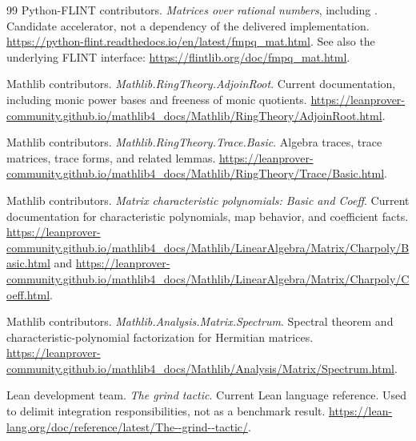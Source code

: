 \begin{thebibliography}{99}
Python-FLINT contributors. \emph{Matrices over rational numbers}, including . Candidate accelerator, not a dependency of the delivered implementation.
\url{https://python-flint.readthedocs.io/en/latest/fmpq_mat.html}.
See also the underlying FLINT interface:
\url{https://flintlib.org/doc/fmpq_mat.html}.

Mathlib contributors. \emph{Mathlib.RingTheory.AdjoinRoot}. Current documentation, including monic power bases and freeness of monic quotients.
\url{https://leanprover-community.github.io/mathlib4_docs/Mathlib/RingTheory/AdjoinRoot.html}.

Mathlib contributors. \emph{Mathlib.RingTheory.Trace.Basic}. Algebra traces, trace matrices, trace forms, and related lemmas.
\url{https://leanprover-community.github.io/mathlib4_docs/Mathlib/RingTheory/Trace/Basic.html}.

Mathlib contributors. \emph{Matrix characteristic polynomials: Basic and Coeff}. Current documentation for characteristic polynomials, map behavior, and coefficient facts.
\url{https://leanprover-community.github.io/mathlib4_docs/Mathlib/LinearAlgebra/Matrix/Charpoly/Basic.html} and
\url{https://leanprover-community.github.io/mathlib4_docs/Mathlib/LinearAlgebra/Matrix/Charpoly/Coeff.html}.

Mathlib contributors. \emph{Mathlib.Analysis.Matrix.Spectrum}. Spectral theorem and characteristic-polynomial factorization for Hermitian matrices.
\url{https://leanprover-community.github.io/mathlib4_docs/Mathlib/Analysis/Matrix/Spectrum.html}.

Lean development team. \emph{The grind tactic}. Current Lean language reference. Used to delimit integration responsibilities, not as a benchmark result.
\url{https://lean-lang.org/doc/reference/latest/The--grind--tactic/}.
\end{thebibliography}

